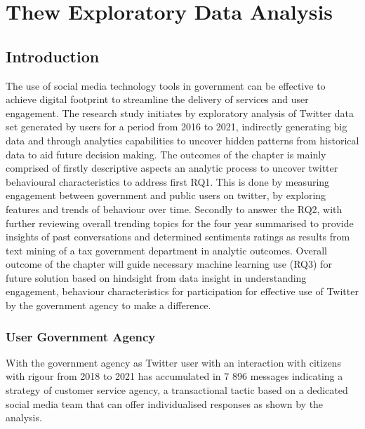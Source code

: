 
\chapter{Thew Exploratory Data Analysis}
\label{chap:chapter4}

\section{Introduction}

The use of social media technology tools in government can be effective to  achieve digital footprint to streamline the delivery of services and user engagement.  The research study initiates by exploratory analysis of Twitter data set generated by users for a period from 2016 to 2021, indirectly generating big data and through analytics capabilities to uncover hidden patterns from historical data to aid future decision making.   The outcomes of the chapter is mainly comprised of firstly descriptive aspects an analytic process to uncover twitter behavioural characteristics to address first RQ1. This is done by measuring engagement between government and public users on twitter, by exploring features and trends of behaviour over time.  Secondly to answer the RQ2, with further reviewing overall trending topics for the four year summarised to provide insights of past conversations and determined sentiments ratings as results from text mining of a tax government department in analytic outcomes.  Overall outcome of the chapter will guide necessary machine learning use (RQ3) for future solution based on hindsight from data insight in understanding engagement, behaviour characteristics for participation for effective use of Twitter by the government agency to make a difference.\\

\subsection{User Government Agency}

With the government agency as Twitter user with an interaction with citizens with rigour from 2018 to 2021 has accumulated in 7 896 messages indicating a strategy of customer service agency, a transactional tactic based on a dedicated social media team that can offer individualised responses as shown by the analysis.

